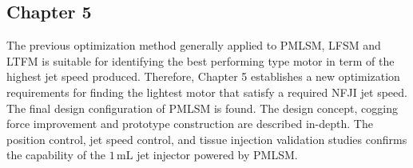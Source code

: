     
    \subsection{Chapter 5}  \label{Chapter:intro/outline/chapter5}
    
    
    The previous optimization method generally applied to \acs{PMLSM}, \acs{LFSM} and \acs{LTFM} is suitable for identifying the best performing type motor in term of the highest jet speed produced. Therefore, Chapter 5 establishes a new optimization requirements for finding the lightest motor that satisfy a required \acs{NFJI} jet speed. The final design configuration of \acs{PMLSM} is found. The design concept, cogging force improvement and prototype construction are described in-depth. The position control, jet speed control, and tissue injection validation studies confirms the capability of the $1\,\mathrm{mL}$ jet injector powered by \acs{PMLSM}.
    